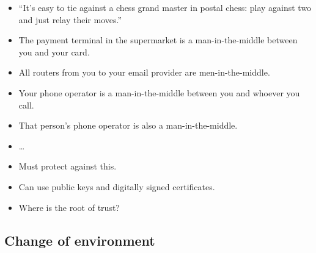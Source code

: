 \begin{frame}
  \begin{example}
    \begin{itemize}
      \item \enquote{It's easy to tie against a chess grand master in postal 
          chess: play against two and just relay their moves.}
    \end{itemize}
  \end{example}

  \pause

  \begin{example}
    \begin{itemize}
      \item The payment terminal in the supermarket is a man-in-the-middle 
        between you and your card.
    \end{itemize}
  \end{example}
\end{frame}

\begin{frame}
  \begin{example}
    \begin{itemize}
      \item All routers from you to your email provider are men-in-the-middle.
      \item Your phone operator is a man-in-the-middle between you and whoever 
        you call.
      \item That person's phone operator is also a man-in-the-middle.
      \item \dots
    \end{itemize}
  \end{example}

  \pause

  \begin{remark}
    \begin{itemize}
      \item Must protect against this.
      \item Can use public keys and digitally signed certificates.
      \item Where is the root of trust?
    \end{itemize}
  \end{remark}
\end{frame}

\subsection{Change of environment}

